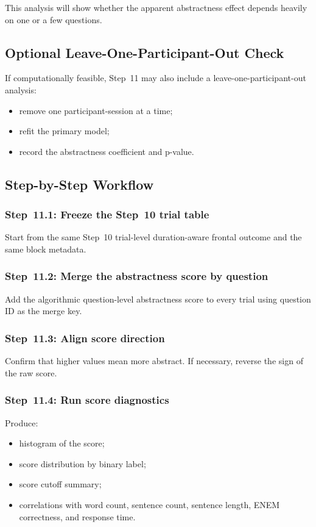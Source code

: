 This analysis will show whether the apparent abstractness effect depends heavily on one or a few questions.

\subsection{Optional Leave-One-Participant-Out Check}
If computationally feasible, Step~11 may also include a leave-one-participant-out analysis:
\begin{itemize}
    \item remove one participant-session at a time;
    \item refit the primary model;
    \item record the abstractness coefficient and p-value.
\end{itemize}

\subsection{Step-by-Step Workflow}

\subsubsection{Step~11.1: Freeze the Step~10 trial table}
Start from the same Step~10 trial-level duration-aware frontal outcome and the same block metadata.

\subsubsection{Step~11.2: Merge the abstractness score by question}
Add the algorithmic question-level abstractness score to every trial using question ID as the merge key.

\subsubsection{Step~11.3: Align score direction}
Confirm that higher values mean more abstract.
If necessary, reverse the sign of the raw score.

\subsubsection{Step~11.4: Run score diagnostics}
Produce:
\begin{itemize}
    \item histogram of the score;
    \item score distribution by binary label;
    \item score cutoff summary;
    \item correlations with word count, sentence count, sentence length, ENEM correctness, and response time.
\end{itemize}

